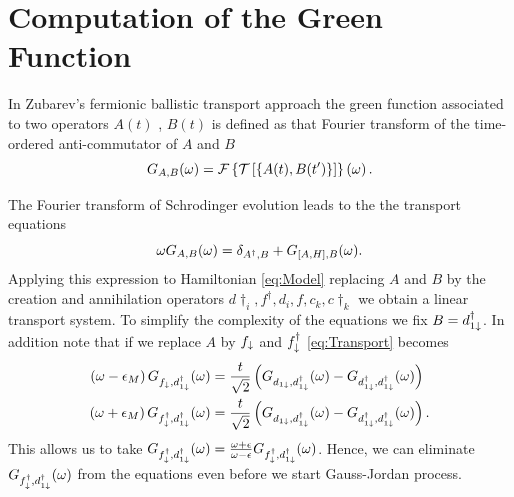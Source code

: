 \documentclass[showpacs,aps,prb,reprint,superscriptaddress]{revtex4-1}
\newcommand{\LUIS}[1]{\textcolor{blue}{\fbox{Luis} {\sl#1}}}
\begin{document}




%




 \appendix

 
 \section{Computation of the Green Function \label{sec:Appendix_alg}}
 In Zubarev's fermionic ballistic transport approach \cite{zubarev_double-time_1960} the green function associated to two operators $A(t)$ , $B(t)$ is defined as that Fourier transform of the time-ordered anti-commutator of $A$ and $B$
\begin{equation}
  G_{A,B}(\omega)= \mathcal{F}\left\{ \mathcal{T}\left[\left\{ A(t),B(t')\right\} \right]\right\} \left(\omega\right).
  \label{eq:greenFunction}
\end{equation}

The Fourier transform of Schrodinger evolution leads to the the transport equations 
\begin{equation}
    \omega G_{A,B}(\omega)=\delta_{A^{\dagger},B}+G_{\left[A,H\right],B}(\omega).
    \label{eq:Transport}
\end{equation}
\noindent Applying this expression to Hamiltonian \eqref{eq:Model} replacing $A$ and $B$ by the creation and annihilation operators $d\dagger_i, f^\dagger, d_i,f ,c_k,c\dagger_k$ we obtain a linear transport system. To simplify the complexity of the equations we fix $B = d^\dagger_{1\downarrow}$. In addition note that if we replace $A$ by $f_\downarrow$ and $f^\dagger_\downarrow$ \ref{eq:Transport} becomes
\begin{align}
        \left(\omega-\epsilon_{M}\right)G_{f_{\downarrow},d_{1\downarrow}^{\dagger}}(\omega)&=\frac{t}{\sqrt{2}}\left(G_{d_{1\downarrow},d_{1\downarrow}^{\dagger}}(\omega)-G_{d_{1\downarrow}^{\dagger},d_{1\downarrow}^{\dagger}}(\omega)\right) \\
    \left(\omega+\epsilon_{M}\right)G_{f_{\downarrow}^{\dagger},d_{1\downarrow}^{\dagger}}(\omega)&=\frac{t}{\sqrt{2}}\left(G_{d_{1\downarrow},d_{1\downarrow}^{\dagger}}(\omega)-G_{d_{1\downarrow}^{\dagger},d_{1\downarrow}^{\dagger}}(\omega)\right).
\end{align}
\noindent This allows us to take $G_{f_{\downarrow}^{\dagger},d_{1\downarrow}^{\dagger}}(\omega) = \frac{\omega + \epsilon}{\omega -\epsilon}G_{f_{\downarrow}^{\dagger},d_{1\downarrow}^{\dagger}}(\omega) $. Hence, we can eliminate $G_{f_{\downarrow}^{\dagger},d_{1\downarrow}^{\dagger}}(\omega) $ from the equations even before we start Gauss-Jordan process.
\end{document}
